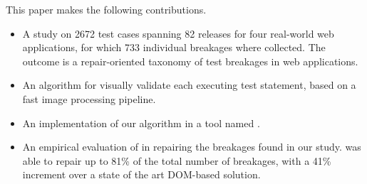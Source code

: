 This paper makes the following contributions.
\begin{itemize}
\item A study on 2672 test cases spanning 82 releases for four real-world web applications, for which 733 individual breakages where collected. The outcome is a repair-oriented taxonomy of test breakages in web applications.
\item An algorithm for visually validate each executing test statement, based on a fast image processing pipeline.
\item An implementation of our algorithm in a tool named \tool.
\item An empirical evaluation of \tool in repairing the breakages found in our study. \tool was able to repair up to 81\% of the total number of breakages, with a 41\% increment over a state of the art DOM-based solution.
\end{itemize}








